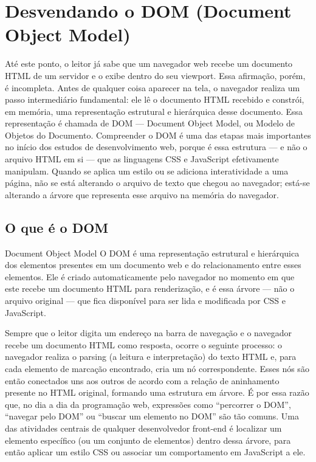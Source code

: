 \chapter{Desvendando o DOM (Document Object Model)}

Até este ponto, o leitor já sabe que um navegador web recebe um documento HTML de um servidor e o exibe dentro do seu viewport. Essa afirmação, porém, é incompleta. Antes de qualquer coisa aparecer na tela, o navegador realiza um passo intermediário fundamental: ele lê o documento HTML recebido e constrói, em memória, uma representação estrutural e hierárquica desse documento. Essa representação é chamada de DOM — Document Object Model, ou Modelo de Objetos do Documento. Compreender o DOM é uma das etapas mais importantes no início dos estudos de desenvolvimento web, porque é essa estrutura — e não o arquivo HTML em si — que as linguagens CSS e JavaScript efetivamente manipulam. Quando se aplica um estilo ou se adiciona interatividade a uma página, não se está alterando o arquivo de texto que chegou ao navegador; está-se alterando a árvore que representa esse arquivo na memória do navegador.

\section{O que é o DOM}

\begin{infobox}{Document Object Model}
O DOM é uma representação estrutural e hierárquica dos elementos presentes em um documento web e do relacionamento entre esses elementos. Ele é criado automaticamente pelo navegador no momento em que este recebe um documento HTML para renderização, e é essa árvore — não o arquivo original — que fica disponível para ser lida e modificada por CSS e JavaScript.
\end{infobox}

Sempre que o leitor digita um endereço na barra de navegação e o navegador recebe um documento HTML como resposta, ocorre o seguinte processo: o navegador realiza o parsing (a leitura e interpretação) do texto HTML e, para cada elemento de marcação encontrado, cria um nó correspondente. Esses nós são então conectados uns aos outros de acordo com a relação de aninhamento presente no HTML original, formando uma estrutura em árvore. É por essa razão que, no dia a dia da programação web, expressões como “percorrer o DOM”, “navegar pelo DOM” ou “buscar um elemento no DOM” são tão comuns. Uma das atividades centrais de qualquer desenvolvedor front-end é localizar um elemento específico (ou um conjunto de elementos) dentro dessa árvore, para então aplicar um estilo CSS ou associar um comportamento em JavaScript a ele.

